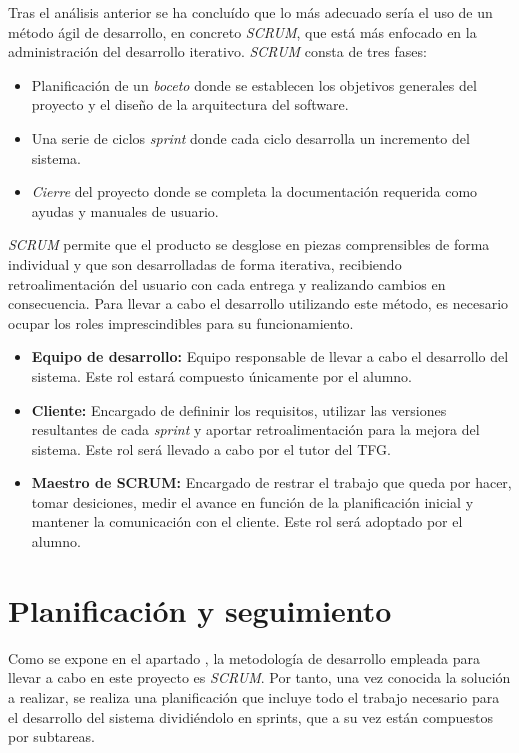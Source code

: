 \documentclass[12pt]{article}
\begin{document}
    Tras el análisis anterior se ha concluído que lo más adecuado sería el uso de un método ágil de desarrollo, en concreto \textit{SCRUM}, que está más enfocado en la administración del desarrollo iterativo. \textit{SCRUM} consta de tres fases:
    
    \begin{itemize}
        \item Planificación de un \textit{boceto} donde se establecen los objetivos generales del proyecto y el diseño de la arquitectura del software.
        \item Una serie de ciclos \textit{sprint} donde cada ciclo desarrolla un incremento del sistema.
        \item \textit{Cierre} del proyecto donde se completa la documentación requerida como ayudas y manuales de usuario.
    \end{itemize}

    \textit{SCRUM} permite que el producto se desglose en piezas comprensibles de forma individual y que son desarrolladas de forma iterativa, recibiendo retroalimentación del usuario con cada entrega y realizando cambios en consecuencia. Para llevar a cabo el desarrollo utilizando este método, es necesario ocupar los roles imprescindibles para su funcionamiento.

    \begin{itemize}
        \item \textbf{Equipo de desarrollo:} Equipo responsable de llevar a cabo el desarrollo del sistema. Este rol estará compuesto únicamente por el alumno.
        \item \textbf{Cliente:} Encargado de defininir los requisitos, utilizar las versiones resultantes de cada \textit{sprint} y aportar retroalimentación para la mejora del sistema. Este rol será llevado a cabo por el tutor del TFG.
        \item \textbf{Maestro de SCRUM:} Encargado de restrar el trabajo que queda por hacer, tomar desiciones, medir el avance en función de la planificación inicial y mantener la comunicación con el cliente. Este rol será adoptado por el alumno.
    \end{itemize}

\section{Planificación y seguimiento}
    Como se expone en el apartado , la metodología de desarrollo empleada para llevar a cabo en este proyecto es \textit{SCRUM}. Por tanto, una vez conocida la solución a realizar, se realiza una planificación que incluye todo el trabajo necesario para el desarrollo del sistema dividiéndolo en sprints, que a su vez están compuestos por subtareas.
\end{document}

